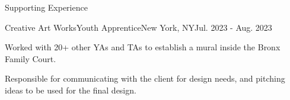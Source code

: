 \documentclass[]{rh-resume}
\begin{document}
\begin{section}{Supporting Experience}
    \begin{subsection}{Creative Art Works}{Youth Apprentice}{New York, NY}{Jul. 2023 - Aug. 2023}
        \item Worked with 20+ other YAs and TAs to establish a mural inside the Bronx Family Court.
        \item Responsible for communicating with the client for design needs, and pitching ideas to be used for the final design.
    \end{subsection}
\end{section}
\end{document}
